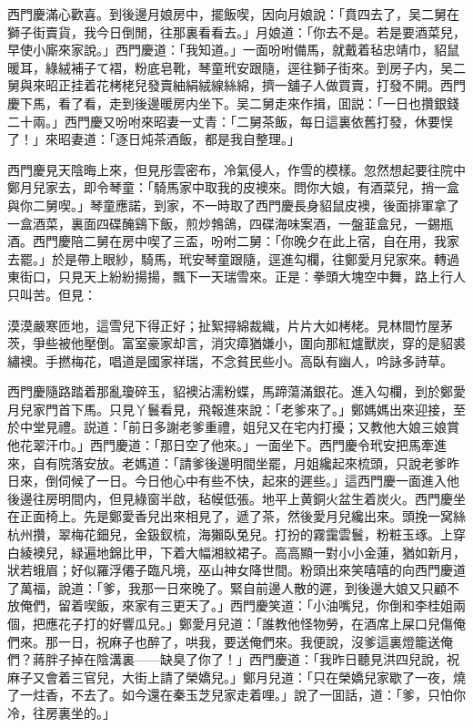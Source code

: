 西門慶滿心歡喜。到後邊月娘房中，擺飯喫，因向月娘說：「賁四去了，吴二舅在獅子街賣貨，我今日倒閒，往那裏看看去。」月娘道：「你去不是。若是要酒菜兒，早使小廝來家說。」西門慶道：「我知道。」一面吩咐備馬，就戴着毡忠靖巾，貂鼠暖耳，綠絨補子て褶，粉底皂靴，琴童玳安跟隨，逕往獅子街來。到房子内，吴二舅與來昭正挂着花栲栳兒發賣紬絹絨線絲綿，擠一舖子人做買賣，打發不開。西門慶下馬，看了看，走到後邊暖房内坐下。吴二舅走來作揖，囬説：「一日也攢銀錢二十兩。」西門慶又吩咐來昭妻一丈青：「二舅茶飯，每日這裏依舊打發，休要悮了！」來昭妻道：「逐日炖茶酒飯，都是我自整理。」

西門慶見天陰晦上來，但見彤雲密布，冷氣侵人，作雪的模樣。忽然想起要往院中鄭月兒家去，即令琴童：「騎馬家中取我的皮襖來。問你大娘，有酒菜兒，捎一盒與你二舅喫。」琴童應諾，到家，不一時取了西門慶長身貂鼠皮襖，後面排軍拿了一盒酒菜，裏面四碟醃鷄下飯，煎炒鵓鴿，四碟海味案酒，一盤韮盒兒，一錫瓶酒。西門慶陪二舅在房中喫了三盃，吩咐二舅：「你晚夕在此上宿，自在用，我家去罷。」於是帶上眼紗，騎馬，玳安琴童跟隨，逕進勾欄，往鄭愛月兒家來。轉過東街口，只見天上紛紛揚揚，飄下一天瑞雪來。正是：拳頭大塊空中舞，路上行人只叫苦。但見：

\begin{myquote}
漠漠嚴寒匝地，這雪兒下得正好；扯絮撏綿裁織，片片大如栲栳。見林間竹屋茅茨，爭些被他壓倒。富室豪家却言，消灾瘴猶嫌小，圍向那紅爐獸炭，穿的是貂裘繡襖。手撚梅花，唱道是國家祥瑞，不念貧民些小。高臥有幽人，吟詠多詩草。
\end{myquote}

西門慶隨路踏着那亂瓊碎玉，貂襖沾濡粉蝶，馬蹄蕩滿銀花。進入勾欄，到於鄭愛月兒家門首下馬。只見丫鬟看見，飛報進來說：「老爹來了。」鄭媽媽出來迎接，至於中堂見禮。説道：「前日多謝老爹重禮，姐兒又在宅内打擾；又教他大娘三娘賞他花翠汗巾。」西門慶道：「那日空了他來。」一面坐下。西門慶令玳安把馬牽進來，自有院落安放。老媽道：「請爹後邊明間坐罷，月姐纔起來梳頭，只說老爹昨日來，倒伺候了一日。今日他心中有些不快，起來的遲些。」這西門慶一面進入他後邊往房明間内，但見綠窗半啟，毡幙低張。地平上黄銅火盆生着炭火。西門慶坐在正面椅上。先是鄭愛香兒出來相見了，遞了茶，然後愛月兒纔出來。頭挽一窝絲杭州攢，翠梅花鈿兒，金鈒釵梳，海獺臥兔兒。打扮的霧靄雲鬟，粉粧玉琢。上穿白綾襖兒，緑遍地錦比甲，下着大幅湘紋裙子。高高顯一對小小金蓮，猶如新月，狀若蛾眉；好似羅浮僊子臨凡境，巫山神女降世間。粉頭出來笑嘻嘻的向西門慶道了萬福，說道：「爹，我那一日來晚了。緊自前邊人散的遲，到後邊大娘又只顧不放俺們，留着喫飯，來家有三更天了。」西門慶笑道：「小油嘴兒，你倒和李桂姐兩個，把應花子打的好響瓜兒。」鄭愛月兒道：「誰教他怪物勞，在酒席上屎口兒傷俺們來。那一日，祝麻子也醉了，哄我，要送俺們來。我便說，沒爹這裏燈籠送俺們？蔣胖子掉在陰溝裏——缺臭了你了！」西門慶道：「我昨日聽見洪四兒說，祝麻子又會着三官兒，大街上請了榮嬌兒。」鄭月兒道：「只在榮嬌兒家歇了一夜，燒了一炷香，不去了。如今還在秦玉芝兒家走着哩。」說了一囬話，道：「爹，只怕你冷，往房裏坐的。」

